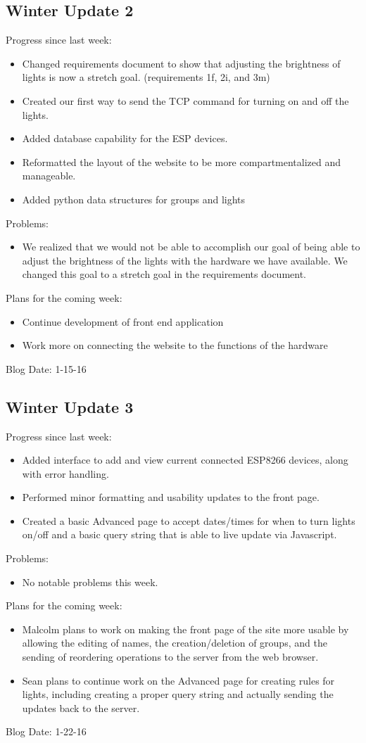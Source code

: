 \subsection{Winter Update 2}
Progress since last week:
\begin{itemize}
\item Changed requirements document to show that adjusting the brightness of lights is now a stretch goal. (requirements 1f, 2i, and 3m)
\item Created our first way to send the TCP command for turning on and off the lights.
\item Added database capability for the ESP devices.
\item Reformatted the layout of the website to be more compartmentalized and manageable.
\item Added python data structures for groups and lights
\end{itemize}
Problems:
\begin{itemize}
\item We realized that we would not be able to accomplish our goal of being able to adjust the brightness of the lights with the hardware we have available. We changed this goal to a stretch goal in the requirements document.
\end{itemize}
Plans for the coming week: 
\begin{itemize}
\item Continue development of front end application
\item Work more on connecting the website to the functions of the hardware
\end{itemize}
Blog Date: 1-15-16

\subsection{Winter Update 3}
Progress since last week:
\begin{itemize}
\item Added interface to add and view current connected ESP8266 devices, along with error handling.
\item Performed minor formatting and usability updates to the front page.
\item Created a basic Advanced page to accept dates/times for when to turn lights on/off and a basic query string that is able to live update via Javascript.
\end{itemize}
Problems:
\begin{itemize}
\item No notable problems this week.
\end{itemize}
Plans for the coming week: 
\begin{itemize}
\item Malcolm plans to work on making the front page of the site more usable by allowing the editing of names, the creation/deletion of groups, and the sending of reordering operations to the server from the web browser.
\item Sean plans to continue work on the Advanced page for creating rules for lights, including creating a proper query string and actually sending the updates back to the server.
\end{itemize}
Blog Date: 1-22-16


